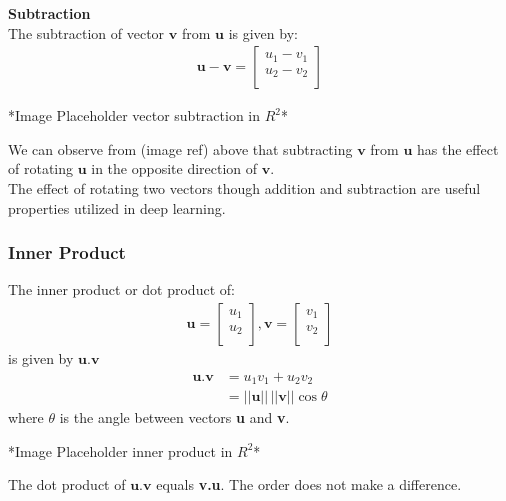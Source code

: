 \noindent\textbf{Subtraction} \\
The subtraction of vector $\textbf{v}$ from $\textbf{u}$ is given by:
\begin{align}
    \textbf{u} - \textbf{v} =
      \begin{bmatrix}
        u_1 - v_1 \\
        u_2 - v_2 \\
      \end{bmatrix}
      \label{eq:subtraction_vectors}
\end{align}
\begin{center}
    *Image Placeholder vector subtraction in $R^2$*    
\end{center}
We can observe from (image ref) above that subtracting $\textbf{v}$ from $\textbf{u}$ has the effect of rotating $\textbf{u}$ in the opposite direction of $\textbf{v}$.\\
\vspace{1mm}
\noindent The effect of rotating two vectors though addition and subtraction are useful properties utilized in deep learning.
\subsubsection{Inner Product}
\noindent The inner product or dot product of: 
\begin{align}
    \textbf{u} = \begin{bmatrix}
        u_1 \\
        u_2 \\
      \end{bmatrix},
      \textbf{v} = \begin{bmatrix}
        v_1 \\
        v_2 \\
      \end{bmatrix}
\end{align}
is given by $\textbf{u}.\textbf{v}$
\begin{align}
  \textbf{u.v} &= u_1 v_1 + u_2 v_2 \\
  &= ||\textbf{u}|| \, ||\textbf{v}||\cos \theta
  \label{eq:cosine_rule_dot_product}
\end{align}
where $\theta$ is the angle between vectors \textbf{u} and \textbf{v}.
\begin{center}
  *Image Placeholder inner product in $R^2$*    
\end{center}
The dot product of $\textbf{u.v}$ equals \textbf{v.u}. The order does not make a difference.
